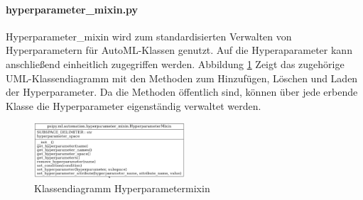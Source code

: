 	\paragraph{hyperparameter\_mixin.py}  Hyperparameter\_mixin wird zum standardisierten Verwalten von Hyperparametern für AutoML-Klassen genutzt. Auf die Hyperaparameter kann anschließend einheitlich zugegriffen werden. Abbildung \ref{img:KlassendiagrammHyperparametermixin}  Zeigt das zugehörige UML-Klassendiagramm mit den Methoden zum Hinzufügen, Löschen und Laden der Hyperparameter. Da die Methoden öffentlich sind, können über jede erbende Klasse die Hyperparameter eigenständig verwaltet werden.
	
	\begin{figure}[h]
		\centering
		\includegraphics[width=0.5\textwidth, center]{bilder/Klassendiagramme/Hyperparametermixin.png}
		\caption[Klassendiagramm Hyperparametermixin]{Klassendiagramm Hyperparametermixin}
		\label{img:KlassendiagrammHyperparametermixin}
	\end{figure}  
	
